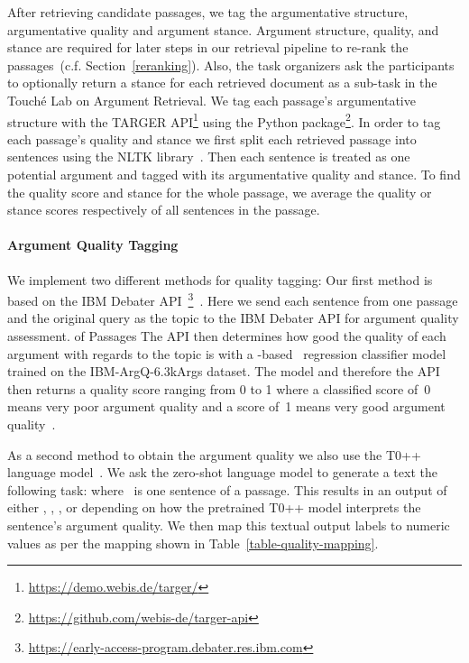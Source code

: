 After retrieving candidate passages, we tag the argumentative structure, argumentative quality and argument stance.
Argument structure, quality, and stance are required for later steps in our retrieval pipeline to re-rank the passages~(c.f. Section~\ref{reranking}).
Also, the task organizers ask the participants to optionally return a stance for each retrieved document as a sub-task in the Touché Lab on Argument Retrieval.
We tag each passage's argumentative structure with the TARGER API\footnote{\url{https://demo.webis.de/targer/}} using the  Python package\footnote{\url{https://github.com/webis-de/targer-api}}.
In order to tag each passage's quality and stance we first split each retrieved passage into sentences using the NLTK library~\cite{BirdLK2009}.
Then each sentence is treated as one potential argument and tagged with its argumentative quality and stance.
To find the quality score and stance for the whole passage, we average the quality or stance scores respectively of all sentences in the passage.

\paragraph{Argument Quality Tagging}


We implement two different methods for quality tagging:
Our first method is based on the IBM Debater API~\footnote{\url{https://early-access-program.debater.res.ibm.com}}~\cite{ToledoGCFVLJAS2019}.
Here we send each sentence from one passage and the original query as the topic to the IBM Debater API for argument quality assessment. of Passages
The API then determines how good the quality of each argument with regards to the topic is with a \Bert-based~\cite{DevlinCLT2019} regression classifier model trained on the IBM-ArgQ-6.3kArgs dataset. The model and therefore the API then returns a quality score ranging from 0 to 1 where a classified score of~0 means very poor argument quality and a score of~1 means very good argument quality~\cite{ToledoGCFVLJAS2019}.

As a second method to obtain the argument quality we also use the T0++ language model~\cite{SanhWRBSACSLRDBXTSSKCNDCJWMSYPBWNRSSFFTBGBWR2021}.
We ask the zero-shot language model to generate a text the following task: \hspace{1.5em}  where ~is one sentence of a passage.
This results in an output of either , , , or  depending on how the pretrained T0++ model interprets the sentence's argument quality.
We then map this textual output labels to numeric values as per the mapping shown in Table~\ref{table-quality-mapping}.

